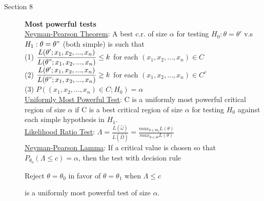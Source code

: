 \documentclass[10pt,landscape]{article}
\begin{document}
\begin{multicols}{3}
	
	\begin{description}
		\item[Section 8] \textbf{Most powerful tests }\\
		\underline{Neyman-Pearson Theorem}: A best c.r. of size $\alpha$ for testing $H_0: \theta = \theta '$ v.s $H_1: \theta = \theta "$ (both simple) is such that \\
		(1) $\dfrac{L(\theta ' ; x_1, x_2, ..., x_n)}{L(\theta " ; x_1, x_2, ..., x_n)}\leq k$ for each $(x_1, x_2, ..., x_n) \in C$\\
		(2) $\dfrac{L(\theta ' ; x_1, x_2, ..., x_n)}{L(\theta " ; x_1, x_2, ..., x_n)}\geq k$ for each $(x_1, x_2, ..., x_n) \in C^c$\\
		(3) $P((x_1, x_2, ..., x_n) \in C; H_0) = \alpha$ \\
		\underline{Uniformly Most Powerful Test}: C is a uniformly most powerful critical region of size $\alpha$ if C is a best critical region of size $\alpha$ for testing $H_0$ against each simple hypothesis in $H_1$. \\
		\underline{Likelihood Ratio Test}: $\Lambda = \frac{L(\hat{\omega})}{L(\hat{\Omega})} = \frac{max_{\theta \in \Theta_0}L(\theta)}{max_{\theta \in \Theta } L(\theta)}$ \\
		\underline{Neyman-Pearson Lamma}: If a critical value is chosen so that $P_{\theta_0}(\Lambda \leq c) = \alpha$, then the test with decision rule \\
		\begin{center}
		Reject $\theta = \theta_0$ in favor of $\theta = \theta_1$ when $\Lambda \leq c$
		\end{center}
		is a uniformly most powerful test of size $\alpha$.
	\end{description}	  
    
\end{multicols}
\end{document}
